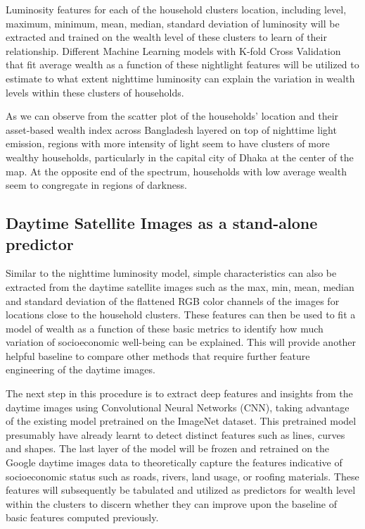 \documentclass[solid,math,chem,code,plot,gloss]{bmc}
\begin{document}
Luminosity features for each of the household clusters location, including level, maximum, minimum, mean, median, standard deviation of luminosity will be extracted and trained on the wealth level of these clusters to learn of their relationship. Different Machine Learning models with K-fold Cross Validation that fit average wealth as a function of these nightlight features will be utilized to estimate to what extent nighttime luminosity can explain the variation in wealth levels within these clusters of households. 

As we can observe from the scatter plot of the households' location and their asset-based wealth index across Bangladesh layered on top of nighttime light emission, regions with more intensity of light seem to have clusters of more wealthy households, particularly in the capital city of Dhaka at the center of the map. At the opposite end of the spectrum, households with low average wealth seem to congregate in regions of darkness.

\subsection{Daytime Satellite Images as a stand-alone predictor}

Similar to the nighttime luminosity model, simple characteristics can also be extracted from the daytime satellite images such as the max, min, mean, median and standard deviation of the flattened RGB color channels of the images for locations close to the household clusters. These features can then be used to fit a model of wealth as a function of these basic metrics to identify how much variation of socioeconomic well-being can be explained. This will provide another helpful baseline to compare other methods that require further feature engineering of the daytime images. 

The next step in this procedure is to extract deep features and insights from the daytime images using Convolutional Neural Networks (CNN), taking advantage of the existing model pretrained on the ImageNet dataset. This pretrained model presumably have already learnt to detect distinct features such as lines, curves and shapes. The last layer of the model will be frozen and retrained on the Google daytime images data to theoretically capture the features indicative of socioeconomic status such as roads, rivers, land usage, or roofing materials. These features will subsequently be tabulated and utilized as predictors for wealth level within the clusters to discern whether they can improve upon the baseline of basic features computed previously. 
\end{document}

